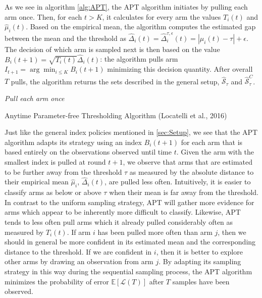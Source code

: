 \documentclass[11pt,]{article}
\begin{document}
As we see in algorithm \ref{alg:APT}, the APT algorithm initiates by
pulling each arm once. Then, for each \(t > K\), it calculates for every
arm the values \(T_i(t)\) and \(\hat{\mu}_i(t)\). Based on the empirical
mean, the algorithm computes the estimated gap between the mean and the
threshold as
\(\hat{\Delta}_i(t) = \hat{\Delta}_i^{\tau, \epsilon}(t) = |\mu_i(t) - \tau| + \epsilon\).
The decision of which arm is sampled next is then based on the value
\(B_i(t+1) = \sqrt{T_i(t)} \hat{\Delta}_i(t)\): the algorithm pulls arm
\(I_{t+1} = \arg \min_{i\leq K} B_i(t+1)\) minimizing this decision
quantity. After overall \(T\) pulls, the algorithm returns the sets
described in the general setup, \(\hat{\mathcal{S}}_{\tau}\) and
\(\hat{\mathcal{S}}^C_{\tau}\).

\IncMargin{1em}

\begin{algorithm}
\Input{$\tau$, $\epsilon$}
\BlankLine
\emph{Pull each arm once}\;
\caption{Anytime Parameter-free Thresholding Algorithm (Locatelli et al., 2016)}\label{alg:APT}
\end{algorithm}

\DecMargin{1em}

Just like the general index policies mentioned in \autoref{sec:Setup},
we see that the APT algorithm adapts its strategy using an index
\(B_i(t+1)\) for each arm that is based entirely on the observations
observed until time \(t\). Given the arm with the smallest index is
pulled at round \(t+1\), we observe that arms that are estimated to be
further away from the threshold \(\tau\) as measured by the absolute
distance to their empirical mean \(\hat{\mu}_i\), \(\hat{\Delta}_i(t)\),
are pulled less often. Intuitively, it is easier to classify arms as
below or above \(\tau\) when their mean is far away from the threshold.
In contrast to the uniform sampling strategy, APT will gather more
evidence for arms which appear to be inherently more difficult to
classify. Likewise, APT tends to less often pull arms which it already
pulled considerably often as measured by \(T_i(t)\). If arm \(i\) has
been pulled more often than arm \(j\), then we should in general be more
confident in its estimated mean and the corresponding distance to the
threshold. If we are confident in \(i\), then it is better to explore
other arms by drawing an observation from arm \(j\). By adapting its
sampling strategy in this way during the sequential sampling process,
the APT algorithm minimizes the probability of error
\(\mathbb{E}[\mathcal{L}(T)]\) after \(T\) samples have been observed.
\end{document}
